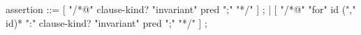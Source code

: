 \begin{syntax}
  assertion ::= [ "/*@" clause-kind? "invariant" pred ";" "*/" ] ;
  | [ { "/*@" "for" id ("," id)* ":" clause-kind? "invariant" pred ";" "*/" } ] ;
\end{syntax}
